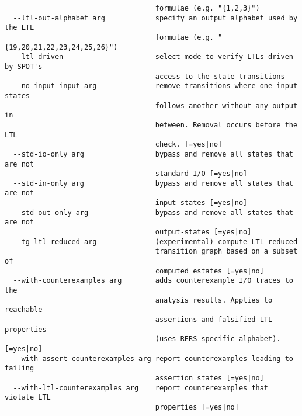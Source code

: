 \documentclass[natbib]{article}
\begin{document}
\begin{verbatim}
                                    formulae (e.g. "{1,2,3}")
  --ltl-out-alphabet arg            specify an output alphabet used by the LTL 
                                    formulae (e.g. "{19,20,21,22,23,24,25,26}")
  --ltl-driven                      select mode to verify LTLs driven by SPOT's
                                    access to the state transitions
  --no-input-input arg              remove transitions where one input states 
                                    follows another without any output in 
                                    between. Removal occurs before the LTL 
                                    check. [=yes|no]
  --std-io-only arg                 bypass and remove all states that are not 
                                    standard I/O [=yes|no]
  --std-in-only arg                 bypass and remove all states that are not 
                                    input-states [=yes|no]
  --std-out-only arg                bypass and remove all states that are not 
                                    output-states [=yes|no]
  --tg-ltl-reduced arg              (experimental) compute LTL-reduced 
                                    transition graph based on a subset of 
                                    computed estates [=yes|no]
  --with-counterexamples arg        adds counterexample I/O traces to the 
                                    analysis results. Applies to reachable 
                                    assertions and falsified LTL properties 
                                    (uses RERS-specific alphabet). [=yes|no]
  --with-assert-counterexamples arg report counterexamples leading to failing 
                                    assertion states [=yes|no]
  --with-ltl-counterexamples arg    report counterexamples that violate LTL 
                                    properties [=yes|no]
\end{verbatim}
\end{document}
